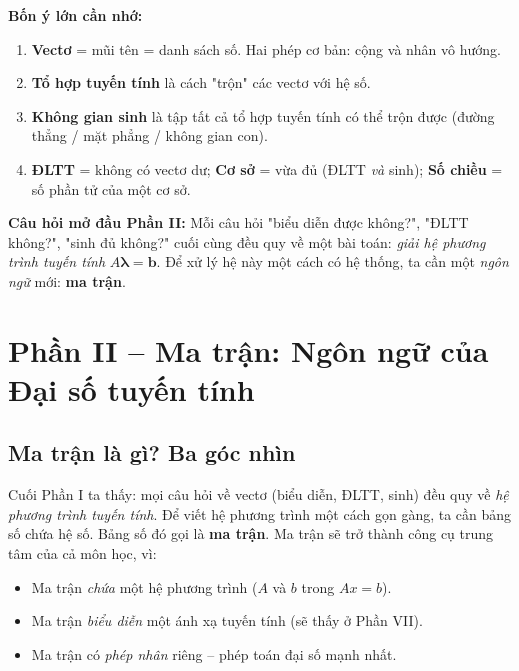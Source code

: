 \documentclass[12pt,a4paper]{article}
\begin{document}
\begin{tongket}[title={Tổng kết Phần I}]
\textbf{Bốn ý lớn cần nhớ:}
\begin{enumerate}
  \item \textbf{Vectơ} = mũi tên = danh sách số. Hai phép cơ bản: cộng và nhân vô hướng.
  \item \textbf{Tổ hợp tuyến tính} là cách "trộn" các vectơ với hệ số.
  \item \textbf{Không gian sinh} là tập tất cả tổ hợp tuyến tính có thể trộn được (đường thẳng / mặt phẳng / không gian con).
  \item \textbf{ĐLTT} = không có vectơ dư; \textbf{Cơ sở} = vừa đủ (ĐLTT \emph{và} sinh); \textbf{Số chiều} = số phần tử của một cơ sở.
\end{enumerate}

\textbf{Câu hỏi mở đầu Phần II:} Mỗi câu hỏi "biểu diễn được không?", "ĐLTT không?", "sinh đủ không?" cuối cùng đều quy về một bài toán: \emph{giải hệ phương trình tuyến tính} $A\boldsymbol{\lambda} = \mathbf{b}$. Để xử lý hệ này một cách có hệ thống, ta cần một \emph{ngôn ngữ} mới: \textbf{ma trận}.
\end{tongket}

\newpage

\section{Phần II -- Ma trận: Ngôn ngữ của Đại số tuyến tính}

\subsection{Ma trận là gì? Ba góc nhìn}

\begin{dongco}
Cuối Phần I ta thấy: mọi câu hỏi về vectơ (biểu diễn, ĐLTT, sinh) đều quy về \emph{hệ phương trình tuyến tính}. Để viết hệ phương trình một cách gọn gàng, ta cần bảng số chứa hệ số. Bảng số đó gọi là \textbf{ma trận}. Ma trận sẽ trở thành công cụ trung tâm của cả môn học, vì:
\begin{itemize}
  \item Ma trận \emph{chứa} một hệ phương trình ($A$ và $b$ trong $Ax = b$).
  \item Ma trận \emph{biểu diễn} một ánh xạ tuyến tính (sẽ thấy ở Phần VII).
  \item Ma trận có \emph{phép nhân} riêng -- phép toán đại số mạnh nhất.
\end{itemize}
\end{dongco}
\end{document}
